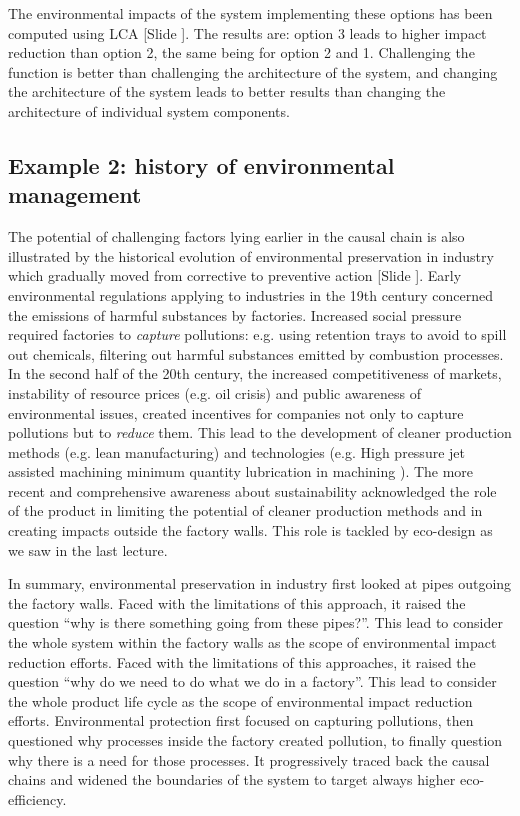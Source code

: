 \documentclass{article}
\newcounter{slide}
\begin{document}
The environmental impacts of the system implementing these options has been computed using LCA {\color{blue}[Slide ]}. The results are: option 3 leads to higher impact reduction than option 2, the same being for option 2 and 1. Challenging the function is better than challenging the architecture of the system, and changing the architecture of the system leads to better results than changing the architecture of individual system components. 


\subsection{Example 2: history of environmental management}
\label{sec:endofpipe}
The potential of challenging factors lying earlier in the causal chain is also illustrated by the historical evolution of environmental preservation in industry which gradually moved from corrective to preventive action {\color{blue}[Slide ]}. Early environmental regulations applying to industries in the 19th century concerned the emissions of harmful substances by factories. Increased social pressure required factories to \emph{capture} pollutions: e.g. using retention trays to avoid to spill out chemicals, filtering out harmful substances emitted by combustion processes. In the second half of the 20th century, the increased competitiveness of markets, instability of resource prices (e.g. oil crisis) and public awareness of environmental issues, created incentives for companies not only to capture pollutions but to \emph{reduce} them. This lead to the development of cleaner production methods (e.g. lean manufacturing) and technologies (e.g. High pressure jet assisted machining \cite{pusavecTransitioningSustainableProduction2010} minimum quantity lubrication in machining \cite{lawalCriticalAssessmentLubrication2013}). The more recent and comprehensive awareness about sustainability acknowledged the role of the product in limiting the potential of cleaner production methods and in creating impacts outside the factory walls. This role is tackled by eco-design as we saw in the last lecture. 

In summary, environmental preservation in industry first looked at pipes outgoing the factory walls. Faced with the limitations of this approach, it raised the question ``why is there something going from these pipes?''. This lead to consider the whole system within the factory walls as the scope of environmental impact reduction efforts. Faced with the limitations of this approaches, it raised the question ``why do we need to do what we do in a factory''. This lead to consider the whole product life cycle as the scope of environmental impact reduction efforts. Environmental protection first focused on capturing pollutions, then questioned why processes inside the factory created pollution, to finally question why there is a need for those processes. It progressively traced back the causal chains and widened the boundaries of the system to target always higher eco-efficiency. 
\end{document}
